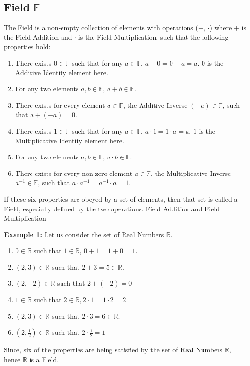 \documentclass[11pt, a4paper]{article}
\begin{document}
	\subsection{Field $\mathbb{F}$}
	The Field is a non-empty collection of elements with operations ($+$, $\cdot$) where $+$ is the Field Addition and $\cdot$ is the Field Multiplication, such that the following properties hold: 
	\begin{enumerate}
		\item There exists $0 \in \mathbb{F}$ such that for any $a \in \mathbb{F}$, $a + 0 = 0 + a = a$. $0$ is the Additive Identity element here.
		\item For any two elements $a,b \in \mathbb{F}$, $a + b \in \mathbb{F}$.
		\item There exists for every element $a \in \mathbb{F}$, the Additive Inverse $(-a) \in \mathbb{F}$, such that $a + (-a) = 0$.
		\item There exists $1 \in \mathbb{F}$ such that for any $a \in \mathbb{F}$, $a \cdot 1 = 1 \cdot a = a$. $1$ is the Multiplicative Identity element here.
		\item For any two elements $a,b \in \mathbb{F}$, $a \cdot b \in \mathbb{F}$.
		\item There exists for every non-zero element $a \in \mathbb{F}$, the Multiplicative Inverse $a^{-1} \in \mathbb{F}$, such that $a \cdot a^{-1} = a^{-1} \cdot a = 1$.
	\end{enumerate}
	If these six properties are obeyed by a set of elements, then that set is called a Field, especially defined by the two operations: Field Addition and Field Multiplication.\newline
	
	\noindent \textbf{Example 1:} Let us consider the set of Real Numbers $\mathbb{R}$.
	
	\begin{enumerate}
		\item $0 \in \mathbb{R}$ such that $1 \in \mathbb{R}$, $0 + 1 = 1 + 0 = 1$. 
		\item $(2,3) \in \mathbb{R}$ such that $2 + 3 = 5 \in \mathbb{R}$.
		\item $(2, -2) \in \mathbb{R}$ such that $ 2 + (-2) = 0$
		\item $1 \in \mathbb{R}$ such that $2 \in \mathbb{R}, 2 \cdot 1 = 1 \cdot 2 = 2$
		\item $(2,3) \in \mathbb{R}$ such that $2 \cdot 3 = 6 \in \mathbb{R}$.
		\item $(2, \frac{1}{2}) \in \mathbb{R}$ such that $ 2 \cdot \frac{1}{2} = 1$
	\end{enumerate}
	Since, six of the properties are being satisfied by the set of Real Numbers $\mathbb{R}$, hence $\mathbb{R}$ is a Field.
	
\end{document}

